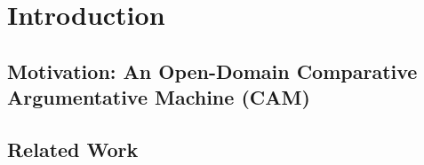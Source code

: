 \chapter{Introduction}

\section{Motivation: An Open-Domain Comparative Argumentative Machine (CAM)}

%
%
%




\section{Related Work}


